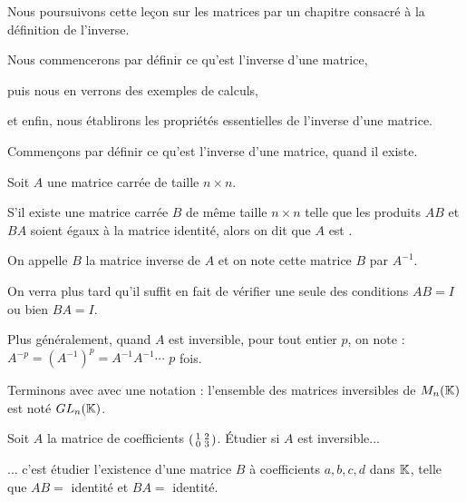 







\debuttexte


\diapo

\change
Nous poursuivons cette leçon sur les matrices par un chapitre consacré à la définition de l'inverse.

\change
Nous commencerons par définir ce qu'est l'inverse d'une matrice,

\change
puis nous en verrons des exemples de calculs,

\change
et enfin, nous établirons les propriétés essentielles de l'inverse d'une matrice.

\diapo

Commençons par définir ce qu'est l'inverse d'une matrice, quand il existe.

Soit $A$ une matrice  carrée de taille $n \times n$. 

\change
S'il existe une matrice carrée $B$ de même taille $n \times n$ telle que les produits
 $AB$ et $ BA$ soient égaux à la matrice identité,
 alors on dit que $A$ est . 
 
 
\change
On appelle $B$ la matrice inverse de $A$ et on note cette matrice $B$ par $A^{-1}$.

\change
On verra plus tard qu'il suffit en fait de vérifier une seule des conditions $AB=I$ ou bien $BA=I$.

\change
Plus généralement, quand $A$ est inversible, pour tout entier $p$, on note : 
$A^{-p}=(A^{-1})^p =A^{-1} A^{-1} \cdots$ $ p$ fois.

\change
Terminons avec avec une notation : l'ensemble des matrices inversibles de $M_{n}(\mathbb{K})$ est noté  $GL_{n}(\mathbb{K})$.


\diapo

Soit $A$ la matrice de coefficients $\left(\begin{smallmatrix}
1 & 2 \cr
0 & 3 \cr
\end{smallmatrix}\right)$. \'Etudier si $A$ est inversible...

\change
... c'est étudier l'existence d'une matrice 
$B$ à coefficients $a, b, c, d$ dans $\mathbb{K}$, telle que $AB=$ identité et $BA=$ identité.

